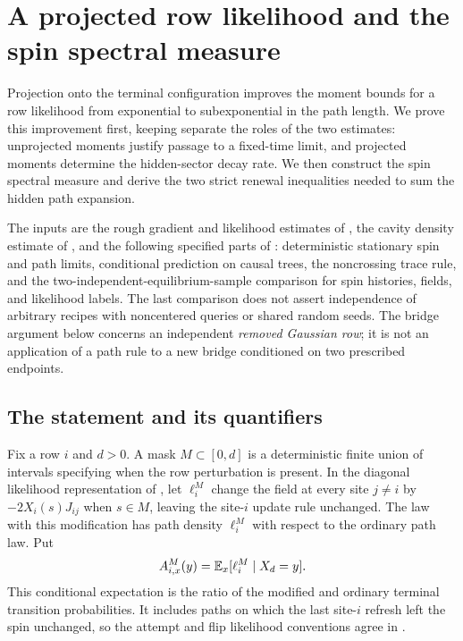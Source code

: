 \section{A projected row likelihood and the spin spectral measure}
\label{sec:row-spin}

Projection onto the terminal configuration improves the moment bounds
for a row likelihood from exponential to subexponential in the path
length.  We prove this improvement first, keeping separate the roles of
the two estimates: unprojected moments justify passage to a fixed-time
limit, and projected moments determine the hidden-sector decay rate.
We then construct the spin spectral measure and derive the two strict
renewal inequalities needed to sum the hidden path expansion.

The inputs are the rough gradient and likelihood estimates of
, the cavity density estimate of
, and the following specified parts of
: deterministic stationary spin and path limits,
conditional prediction on causal trees, the noncrossing trace rule, and
the two-independent-equilibrium-sample comparison for spin histories,
fields, and likelihood labels.  The last comparison does not assert
independence of arbitrary recipes with noncentered queries or shared
random seeds.  The bridge argument below concerns an independent
\emph{removed Gaussian row}; it is not an application of a path rule to a
new bridge conditioned on two prescribed endpoints.

\subsection{The statement and its quantifiers}

Fix a row $i$ and $d>0$.  A mask $M\subset[0,d]$ is a deterministic
finite union of intervals specifying when the row perturbation is
present.  In the diagonal likelihood representation of
, let $\ell_i^M$ change the field at every site
$j\ne i$ by $-2X_i(s)J_{ij}$ when $s\in M$, leaving the site-$i$ update
rule unchanged.  The law with this modification has path density
$\ell_i^M$ with respect to the ordinary path law.  Put
\begin{equation}
 A_{i,x}^M(y)=\mathbb E_x[\ell_i^M\mid X_d=y].
 \label{eq:row-projection}
\end{equation}
This conditional expectation is the ratio of the modified and ordinary
terminal transition probabilities.  It includes paths on which the last
site-$i$ refresh left the spin unchanged, so the attempt and flip
likelihood conventions agree in .

